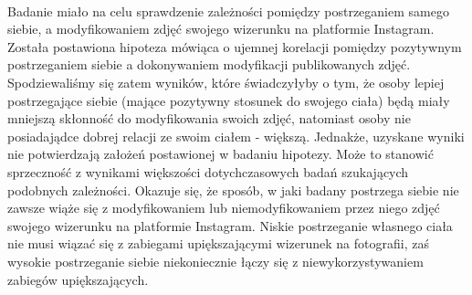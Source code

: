 \documentclass[12pt,a4paper,final,oneside,onecolumn,titlepage]{article}
\begin{document}
\paragraph{}
Badanie miało na celu sprawdzenie zależności pomiędzy postrzeganiem samego siebie, a modyfikowaniem zdjęć swojego wizerunku na platformie Instagram. Została postawiona hipoteza mówiąca o ujemnej korelacji pomiędzy pozytywnym postrzeganiem siebie a dokonywaniem modyfikacji publikowanych zdjęć. Spodziewaliśmy się zatem wyników, które świadczyłyby o tym, że osoby lepiej postrzegające siebie (mające pozytywny stosunek do swojego ciała) będą miały mniejszą skłonność do modyfikowania swoich zdjęć, natomiast osoby nie posiadajądce dobrej relacji ze swoim ciałem - większą. Jednakże, uzyskane wyniki nie potwierdzają założeń postawionej w badaniu hipotezy. Może to stanowić sprzeczność z wynikami większości dotychczasowych badań szukających podobnych zależności. Okazuje się, że sposób, w jaki badany postrzega siebie nie zawsze wiąże się z modyfikowaniem lub niemodyfikowaniem przez niego zdjęć swojego wizerunku na platformie Instagram. Niskie postrzeganie własnego ciała nie musi wiązać się z zabiegami upiększającymi wizerunek na fotografii, zaś wysokie postrzeganie siebie niekoniecznie łączy się z niewykorzystywaniem zabiegów upiększających.
\end{document}
